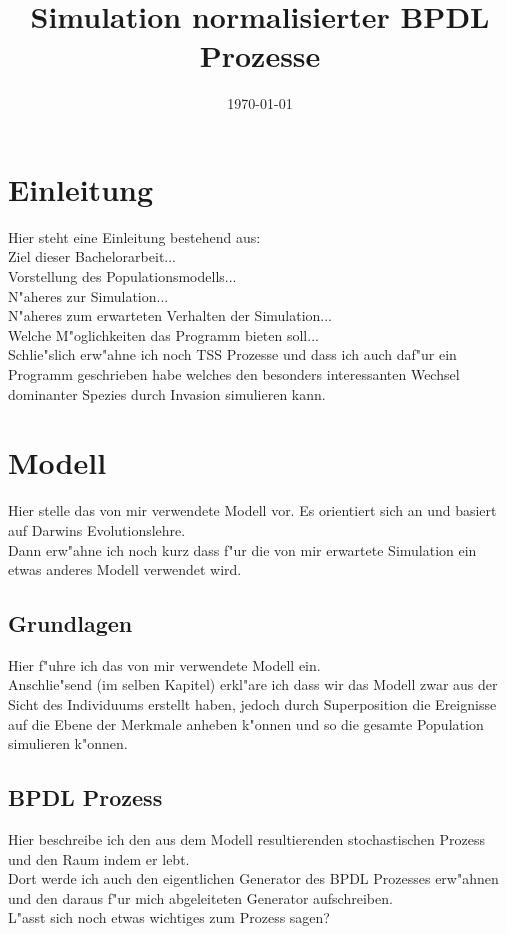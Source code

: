 \documentclass[11pt, a4paper, german]{article}
\date{\today}
\title{Simulation normalisierter BPDL Prozesse}
\begin{document}
\maketitle
\tableofcontents

\clearpage


\section{Einleitung}
Hier steht eine Einleitung bestehend aus:\\
Ziel dieser Bachelorarbeit...\\
Vorstellung des Populationsmodells...\\
N"aheres zur Simulation... \\
N"aheres zum erwarteten Verhalten der Simulation...\\
Welche M"oglichkeiten das Programm bieten soll...\\
Schlie"slich erw"ahne ich noch TSS Prozesse und dass ich auch daf"ur ein Programm geschrieben habe welches den besonders interessanten Wechsel dominanter Spezies durch Invasion simulieren kann.


\clearpage
\section{Modell}
Hier stelle  das von mir verwendete Modell vor. Es orientiert sich an \cite{Champagnat20061127} und basiert auf Darwins Evolutionslehre.\\
Dann erw"ahne ich noch kurz dass f"ur die von mir erwartete Simulation ein etwas anderes Modell verwendet wird.

	\subsection{Grundlagen}
	Hier f"uhre ich das von mir verwendete Modell ein.\\
	Anschlie"send (im selben Kapitel) erkl"are ich dass wir das Modell zwar aus der Sicht des Individuums erstellt haben, jedoch durch Superposition die Ereignisse auf die Ebene der Merkmale anheben k"onnen und so die gesamte Population simulieren k"onnen.
	
	\subsection{BPDL Prozess}
	Hier beschreibe ich den aus dem Modell resultierenden stochastischen Prozess und den Raum indem er lebt. \\
	Dort werde ich auch den eigentlichen Generator des BPDL Prozesses erw"ahnen und den daraus f"ur mich abgeleiteten Generator aufschreiben.\\
	L"asst sich noch etwas wichtiges zum Prozess sagen?
	
\end{document}
